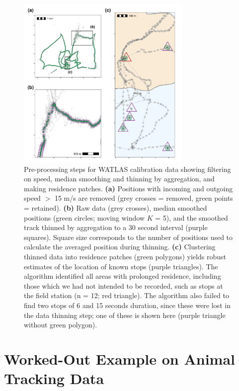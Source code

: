 \documentclass[10pt,paper=a4,headings=standardclasses
]{scrartcl}
\begin{document}
\begin{figure}[h!]
    \centering
    \includegraphics[width=0.75\textwidth]{figures/fig_06_calib_residence_patch.png}
    \caption{Pre-processing steps for WATLAS calibration data showing filtering on speed, median smoothing and thinning by aggregation, and making residence patches.
    \textbf{(a)} Positions with incoming and outgoing speed $>$ 15 m/s are removed (grey crosses = removed, green points = retained).
    \textbf{(b)} Raw data (grey crosses), median smoothed positions (green circles; moving window $K$ = 5), and the smoothed track thinned by aggregation to a 30 second interval (purple squares).
    Square size corresponds to the number of positions used to calculate the averaged position during thinning.
    \textbf{(c)} Clustering thinned data into residence patches (green polygons) yields robust estimates of the location of known stops (purple triangles).
    The algorithm identified all areas with prolonged residence, including those which we had not intended to be recorded, such as stops at the field station (n = 12; red triangle).
    The algorithm also failed to find two stops of 6 and 15 seconds duration, since these were lost in the data thinning step; one of these is shown here (purple triangle without green polygon).}
    \label{fig:figure_calibration}
\end{figure}

\section{Worked-Out Example on Animal Tracking Data}
\end{document}
